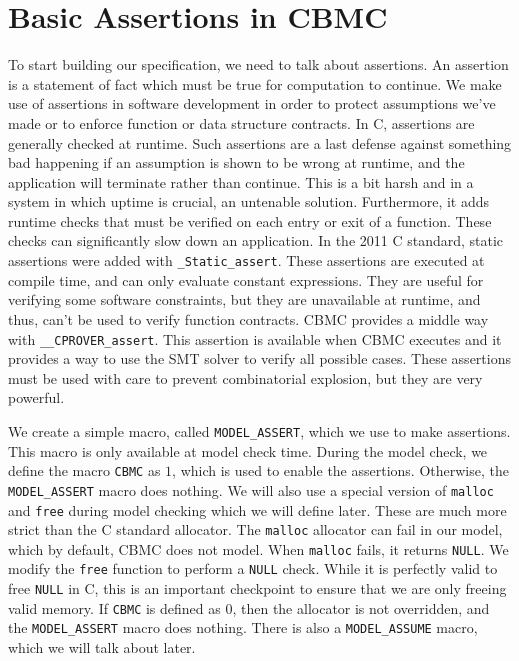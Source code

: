 \section{Basic Assertions in CBMC}

To start building our specification, we need to talk about assertions. An
assertion is a statement of fact which must be true for computation to continue.
We make use of assertions in software development in order to protect
assumptions we've made or to enforce function or data structure contracts. In C,
assertions are generally checked at runtime. Such assertions are a last defense
against something bad happening if an assumption is shown to be wrong at
runtime, and the application will terminate rather than continue. This is a bit
harsh and in a system in which uptime is crucial, an untenable solution.
Furthermore, it adds runtime checks that must be verified on each entry or exit
of a function.  These checks can significantly slow down an application.  In the
2011 C standard, static assertions were added with \verb/_Static_assert/. These
assertions are executed at compile time, and can only evaluate constant
expressions.  They are useful for verifying some software constraints, but they
are unavailable at runtime, and thus, can't be used to verify function
contracts.  CBMC provides a middle way with \verb/__CPROVER_assert/.  This
assertion is available when CBMC executes and it provides a way to use the SMT
solver to verify all possible cases.  These assertions must be used with care to
prevent combinatorial explosion, but they are very powerful.

We create a simple macro, called \verb/MODEL_ASSERT/, which we use to make
assertions.  This macro is only available at model check time. During the model
check, we define the macro \verb/CBMC/ as $1$, which is used to enable the
assertions.  Otherwise, the \verb/MODEL_ASSERT/ macro does nothing. We will also
use a special version of \verb/malloc/ and \verb/free/ during model checking
which we will define later.  These are much more strict than the C standard
allocator.  The \verb/malloc/ allocator can fail in our model, which by default,
CBMC does not model.  When \verb/malloc/ fails, it returns \verb/NULL/. We
modify the \verb/free/ function to perform a \verb/NULL/ check.  While it is
perfectly valid to free \verb/NULL/ in C, this is an important checkpoint to
ensure that we are only freeing valid memory.  If \verb/CBMC/ is defined as $0$,
then the allocator is not overridden, and the \verb/MODEL_ASSERT/ macro does
nothing.  There is also a \verb/MODEL_ASSUME/ macro, which we will talk about
later.

